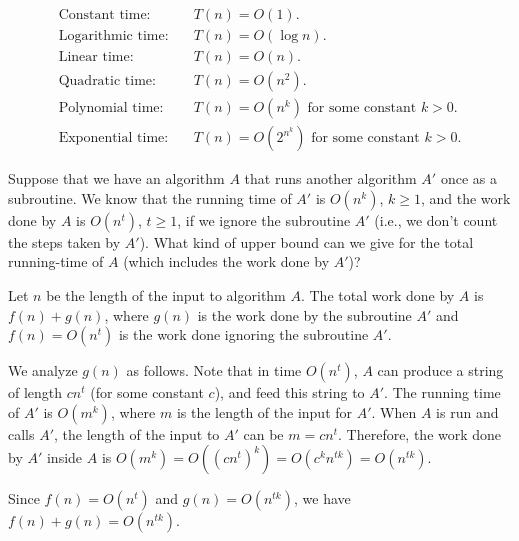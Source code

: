 \begin{definition}
\label{definition:Names-for-common-growth-rates} 
\[ \begin{align*}
\text{Constant time:} & \quad T(n) = O(1). \\
\text{Logarithmic time:} & \quad T(n) = O(\log n). \\
\text{Linear time:} & \quad T(n) = O(n). \\
\text{Quadratic time:} &  \quad T(n) = O(n^2). \\
\text{Polynomial time:} & \quad T(n) = O(n^k) \text{ for some constant $k > 0$}. \\
\text{Exponential time:} & \quad T(n) = O(2^{n^k}) \text{ for some constant $k > 0$}.
\end{align*} \]

\end{definition}

\begin{flex}
\label{grp:exercise:Composing-polynomial-time-algorithms}

\begin{exercise}
\label{exercise:Composing-polynomial-time-algorithms}
Suppose that we have an algorithm $A$ that runs another algorithm $A'$ once as a subroutine. We know that the running time of $A'$ is $O(n^k)$, $k \geq 1$, and the work done by $A$ is $O(n^t)$, $t \geq 1$, if we ignore the subroutine $A'$ (i.e., we don't count the steps taken by $A'$). What kind of upper bound can we give for the total running-time of $A$ (which includes the work done by $A'$)?

\end{exercise}

\begin{solution}
\label{sol:time-complexity::length}
Let $n$ be the length of the input to algorithm $A$. The total work done by $A$ is $f(n) + g(n)$, where $g(n)$ is the work done by the subroutine $A'$ and $f(n) = O(n^t)$ is the work done ignoring the subroutine $A'$. 

We analyze $g(n)$ as follows. Note that in time $O(n^t)$, $A$ can produce a string of length $cn^t$ (for some constant $c$), and feed this string to $A'$. The running time of $A'$ is $O(m^k)$, where $m$ is the length of the input for $A'$. When $A$ is run and calls $A'$, the length of the input to $A'$ can be $m = cn^t$. Therefore, the work done by $A'$ inside $A$ is $O(m^k) = O((cn^t)^k) = O(c^k n^{tk}) = O(n^{tk})$.

Since $f(n) = O(n^t)$ and $g(n) = O(n^{tk})$, we have $f(n) + g(n) = O(n^{tk})$. 

\end{solution}
\end{flex}

